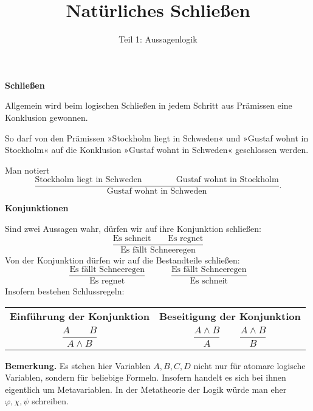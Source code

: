 \documentclass[8pt]{beamer}
\title{Natürliches Schließen}
\subtitle{Teil 1: Aussagenlogik}
\date{}
\newcommand{\strong}[1]{\textsf{\textbf{#1}}}
\newcommand{\centerheadline}[1]{%
  \begin{center}\strong{#1}\end{center}}
\newcommand{\parspace}{\vspace{0.8em}}
\begin{document}
\begin{frame}
\maketitle
\end{frame}

\begin{frame}
\centerheadline{Schließen}
\end{frame}

\begin{frame}
Allgemein wird beim logischen Schließen in jedem Schritt aus Prämissen
eine Konklusion gewonnen.

\parspace
So darf von den Prämissen »Stockholm liegt in Schweden« und
»Gustaf wohnt in Stockholm« auf die Konklusion »Gustaf wohnt in Schweden«
geschlossen werden.\pause

\parspace
Man notiert
\[\dfrac{\text{Stockholm liegt in Schweden}\qquad\qquad\text{Gustaf wohnt in Stockholm}}{
\text{Gustaf wohnt in Schweden}}.\]
\end{frame}

\begin{frame}
\centerheadline{Konjunktionen}
\end{frame}

\begin{frame}[t]
\vspace{2em}
Sind zwei Aussagen wahr, dürfen wir auf ihre Konjunktion schließen:
\[\dfrac{\text{Es schneit}\qquad\text{Es regnet}}{
  \text{Es fällt Schneeregen}}\]\pause
Von der Konjunktion dürfen wir auf die Bestandteile schließen:
\[\dfrac{\text{Es fällt Schneeregen}}{\text{Es regnet}}\qquad\quad
  \dfrac{\text{Es fällt Schneeregen}}{\text{Es schneit}}\]\pause
Insofern bestehen Schlussregeln:
\begin{center}
\begin{tabular}{c@{\qquad\quad}c}
\strong{\small Einführung der Konjunktion}
& \strong{\small Beseitigung der Konjunktion}\\[6pt]
$\dfrac{A\qquad B}{A\land B}$
& $\dfrac{A\land B}{A}\qquad\dfrac{A\land B}{B}$\\
\end{tabular}
\end{center}\pause

\parspace
\begin{footnotesize}
\strong{Bemerkung.} Es stehen hier Variablen $A,B,C,D$ nicht nur
für atomare logische Variablen, sondern für beliebige Formeln.
Insofern handelt es sich bei ihnen eigentlich um Metavariablen.
In der Metatheorie der Logik würde man eher $\varphi,\chi,\psi$
schreiben.
\end{footnotesize}
\end{frame}
\end{document}
